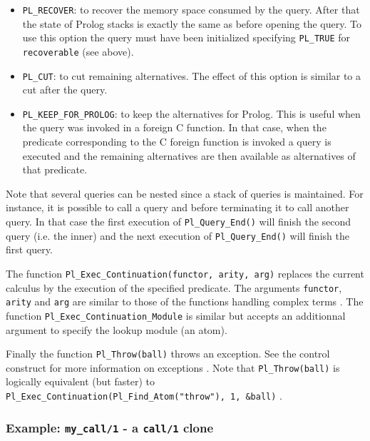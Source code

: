 \begin{itemize}

\item \texttt{PL\_RECOVER}: to recover the memory space consumed by the
query. After that the state of Prolog stacks is exactly the same as before
opening the query. To use this option the query must have been initialized
specifying \texttt{PL\_TRUE} for \texttt{recoverable} (see above).

\item \texttt{PL\_CUT}: to cut remaining alternatives. The effect of this
option is similar to a cut after the query.

\item \texttt{PL\_KEEP\_FOR\_PROLOG}: to keep the alternatives for Prolog.
This is useful when the query was invoked in a foreign C function. In that
case, when the predicate corresponding to the C foreign function is invoked
a query is executed and the remaining alternatives are then available as
alternatives of that predicate.

\end{itemize}

Note that several queries can be nested since a stack of queries is
maintained. For instance, it is possible to call a query and before
terminating it to call another query. In that case the first execution of
\texttt{Pl\_Query\_End()} will finish the second query (i.e. the inner) and
the next execution of \texttt{Pl\_Query\_End()} will finish the first query.

The function \texttt{Pl\_Exec\_Continuation(functor, arity, arg)}
replaces the current calculus by the execution of the specified
predicate. The arguments \texttt{functor}, \texttt{arity} and \texttt{arg}
are similar to those of the functions handling complex terms
.
The function \texttt{Pl\_Exec\_Continuation\_Module} is similar but accepts an
additionnal argument to specify the lookup module (an atom).

Finally the function \texttt{Pl\_Throw(ball)} throws an exception. See the
 control construct for more information on exceptions
. Note that \texttt{Pl\_Throw(ball)} is logically equivalent (but
faster)
to \texttt{Pl\_Exec\_Continuation(Pl\_Find\_Atom("throw"), 1, \&ball)} .

\subsubsection{Example: \texttt{my\_call/1} - a \texttt{call/1} clone}

